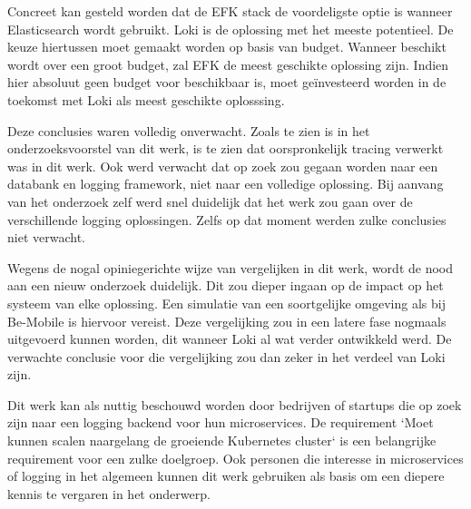 Concreet kan gesteld worden dat de EFK stack de voordeligste optie is wanneer Elasticsearch wordt gebruikt. Loki is de oplossing met het meeste potentieel. De keuze hiertussen moet gemaakt worden op basis van budget. Wanneer beschikt wordt over een groot budget, zal EFK de meest geschikte oplossing zijn. Indien hier absoluut geen budget voor beschikbaar is, moet geïnvesteerd worden in de toekomst met Loki als meest geschikte oplosssing.

Deze conclusies waren volledig onverwacht. Zoals te zien is in het onderzoeksvoorstel van dit werk, is te zien dat oorspronkelijk tracing verwerkt was in dit werk. Ook werd verwacht dat op zoek zou gegaan worden naar een databank en logging framework, niet naar een volledige oplossing. Bij aanvang van het onderzoek zelf werd snel duidelijk dat het werk zou gaan over de verschillende logging oplossingen. Zelfs op dat moment werden zulke conclusies niet verwacht. 

Wegens de nogal opiniegerichte wijze van vergelijken in dit werk, wordt de nood aan een nieuw onderzoek duidelijk. Dit zou dieper ingaan op de impact op het systeem van elke oplossing. Een simulatie van een soortgelijke omgeving als bij Be-Mobile is hiervoor vereist. Deze vergelijking zou in een latere fase nogmaals uitgevoerd kunnen worden, dit wanneer Loki al wat verder ontwikkeld werd. De verwachte conclusie voor die vergelijking zou dan zeker in het verdeel van Loki zijn.

Dit werk kan als nuttig beschouwd worden door bedrijven of startups die op zoek zijn naar een logging backend voor hun microservices. De requirement `Moet kunnen scalen naargelang de groeiende Kubernetes cluster` is een belangrijke requirement voor een zulke doelgroep. Ook personen die interesse in microservices of logging in het algemeen kunnen dit werk gebruiken als basis om een diepere kennis te vergaren in het onderwerp.